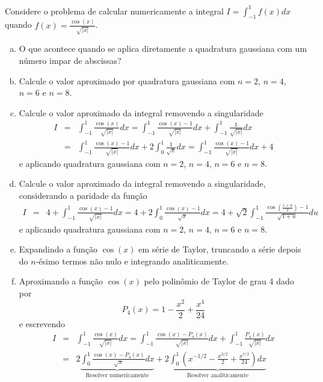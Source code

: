 \begin{exer} Considere o problema de calcular numericamente a integral $I=\int_{-1}^1f(x)dx$ quando $f(x)=\frac{\cos(x)}{\sqrt{|x|}}$.
\begin{enumerate}[a)]
\item O que acontece quando se aplica diretamente a quadratura gaussiana com um número impar de abscissas?
\item Calcule o valor aproximado por quadratura gaussiana com $n=2$, $n=4$, $n=6$ e $n=8$.
\item Calcule o valor aproximado da integral removendo a singularidade
\begin{eqnarray}
I&=&\int_{-1}^1\frac{\cos(x)}{\sqrt{|x|}}dx=\int_{-1}^1\frac{\cos(x)-1}{\sqrt{|x|}}dx+\int_{-1}^1\frac{1}{\sqrt{|x|}}dx \\
&=&\int_{-1}^1\frac{\cos(x)-1}{\sqrt{|x|}}dx+2\int_{0}^1\frac{1}{\sqrt{x}}dx=\int_{-1}^1\frac{\cos(x)-1}{\sqrt{|x|}}dx+4
\end{eqnarray}
e aplicando quadratura gaussiana com $n=2$, $n=4$, $n=6$ e $n=8$.
\item Calcule o valor aproximado da integral removendo a singularidade, considerando a paridade da função
\begin{eqnarray}
I&=&4+\int_{-1}^1\frac{\cos(x)-1}{\sqrt{|x|}}dx=4+2\int_{0}^1\frac{\cos(x)-1}{\sqrt{x}}dx=4+\sqrt{2}\int_{-1}^1\frac{\cos\left(\frac{1+u}{2}\right)-1}{\sqrt{1+u}}du
\end{eqnarray}
e aplicando quadratura gaussiana com $n=2$, $n=4$, $n=6$ e $n=8$.
\item Expandindo a função $\cos(x)$ em série de Taylor, truncando a série depois  do $n$-ésimo  termos não nulo e integrando analiticamente. \\
\item Aproximando a função $\cos(x)$ pelo polinômio de Taylor  de grau 4 dado por \begin{equation} P_4(x)=1-\frac{x^2}{2}+\frac{x^4}{24} \end{equation}
e escrevendo
\begin{eqnarray}I&=&\int_{-1}^1\frac{\cos(x)}{\sqrt{|x|}}dx=\int_{-1}^1\frac{\cos(x)-P_4(x)}{\sqrt{|x|}}dx+\int_{-1}^1\frac{P_4(x)}{\sqrt{|x|}}dx\\
&=&2\underbrace{\int_{0}^1\frac{\cos(x)-P_4(x)}{\sqrt{x}}dx}_{\text{Resolver numericamente}}+2\underbrace{\int_{0}^1\left(x^{-1/2}-\frac{x^{3/2}}{2}+\frac{x^{7/2}}{24}\right)dx}_{\text{Resolver analiticamente}}
\end{eqnarray}
\end{enumerate}
\end{exer}
